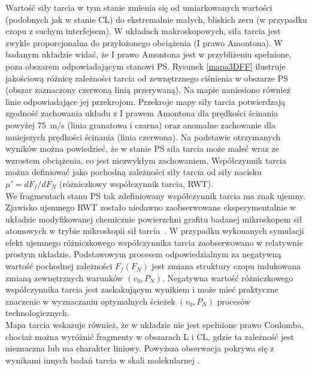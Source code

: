 \documentclass[12pt,a4paper,openright]{report} %
\begin{document}
Wartość siły tarcia w tym stanie zmienia się od umiarkowanych wartości (podobnych jak w stanie CL) do ekstremalnie małych, bliskich zeru (w przypadku czopu z suchym interfejsem). W układach makroskopowych, siła tarcia jest zwykle proporcjonalna do przyłożonego obciążenia (I prawo Amontona). W badanym układzie widać, że I prawo Amontona jest w przybliżeniu spełnione, poza obszarem odpowiadającym stanowi PS. Rysunek \ref{mapa3DFF} ilustruje jakościową różnicę zależności tarcia od zewnętrznego ciśnienia w obszarze PS (obszar zaznaczony czerwoną linią przerywaną). Na mapie naniesiono również linie odpowiadające jej przekrojom. Przekroje mapy siły tarcia potwierdzają zgodność zachowania układu z I prawem Amontona dla prędkości ścinania powyżej $75$~m/s (linia granatowa i czarna) oraz anomalne zachowanie dla mniejszych prędkości ścinania (linia czerwona). Na podstawie otrzymanych wyników można powiedzieć, że w stanie PS siła tarcia może maleć wraz ze wzrostem obciążenia, co jest niezwykłym zachowaniem. Współczynnik tarcia można definiować jako pochodną zależności siły tarcia od siły nacisku $\mu' = {dF_f}/{dF_N}$ (różniczkowy współczynnik tarcia, RWT). \\We fragmentach stanu PS tak zdefiniowany współczynnik tarcia ma znak ujemny. Zjawisko ujemnego RWT zostało niedawno zaobserwowane eksperymentalnie w układzie modyfikowanej chemicznie powierzchni grafitu badanej mikroskopem sił atomowych w trybie mikroskopii sił tarcia~\cite{Deng2012}. W przypadku wykonanych symulacji efekt ujemnego różniczkowego współczynnika tarcia zaobserwowano w relatywnie prostym układzie. Podstawowym procesem odpowiedzialnym za negatywną wartość pochodnej zależności $F_f(F_N)$ jest zmiana struktury czopu indukowana zmianą zewnętrznych warunków $(v_0, P_N)$. Negatywna wartość różniczkowego współczynnika tarcia jest zaskakującym wynikiem i może mieć praktyczne znaczenie w wyznaczaniu optymalnych ścieżek $(v_0, P_N)$ procesów technologicznych.\\
Mapa tarcia wskazuje również, że w układzie nie jest spełnione prawo Coulomba, chociaż można wyróżnić fragmenty w obszarach L i CL, gdzie ta zależność jest nieznaczna lub ma charakter liniowy. Powyższa obserwacja pokrywa się z wynikami innych badań tarcia w skali molekularnej \cite{Braun2006, Socoliuc2004}.   
%
\end{document}
